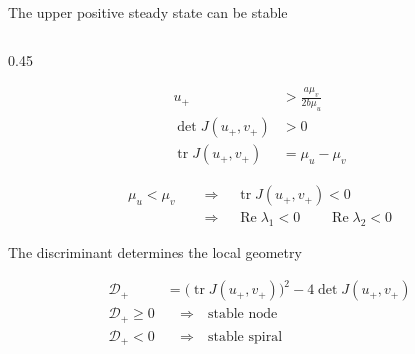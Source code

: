 \begin{frame}{The upper positive steady state can be stable}

  \vspace{-0.20cm}

  \begin{columns}[c,onlytextwidth]

    \begin{column}{0.45\textwidth}

      {\color{HydraWhite}\fontsize{9.5}{12.1}\selectfont
      \begin{align*}
        u_+
        &>
        \frac{a\mu_v}{2b\mu_u}
        \\
        \det J(u_+,v_+)
        &>
        0
        \\
        \operatorname{tr}J(u_+,v_+)
        &=
        \mu_u-\mu_v
      \end{align*}
      }

      \vspace{-0.40cm}

      {\color{HydraGreen}\bfseries\fontsize{10.4}{13.2}\selectfont
      \begin{align*}
        \boxed{\mu_u<\mu_v}
        &\quad\Rightarrow\quad
        \operatorname{tr}J(u_+,v_+)<0
        \\
        &\quad\Rightarrow\quad
        \operatorname{Re}\lambda_1<0
        \qquad
        \operatorname{Re}\lambda_2<0
      \end{align*}
      }

      \vspace{-0.38cm}

      {\color{HydraMuted}\fontsize{7.6}{9.4}\selectfont
        The discriminant determines the local geometry
      \par}

      \vspace{-0.28cm}

      {\color{HydraWhite}\fontsize{8.8}{11.2}\selectfont
      \begin{align*}
        \mathcal D_+
        &=
        \bigl(
          \operatorname{tr}J(u_+,v_+)
        \bigr)^2
        -
        4\det J(u_+,v_+)
        \\
        \mathcal D_+\geq0
        &\quad\Rightarrow\quad
        \text{stable node}
        \\
        \mathcal D_+<0
        &\quad\Rightarrow\quad
        \text{stable spiral}
      \end{align*}
      }


\end{column}
\end{columns}
\end{frame}
